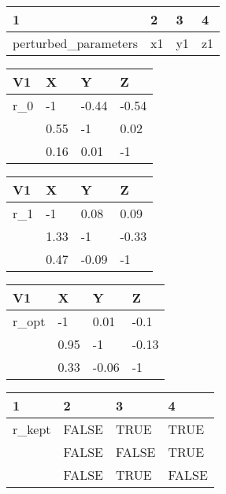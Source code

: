 \documentclass[10pt,a4paper]{article}
\begin{document}
\begin{table}[ht]
\centering
\begin{tabular}{llll}
  \hline
1 & 2 & 3 & 4 \\ 
  \hline
perturbed\_parameters & x1 & y1 & z1 \\ 
   \hline
\end{tabular}
\end{table}


\begin{table}[ht]
\centering
\begin{tabular}{llll}
  \hline
V1 & X & Y & Z \\ 
  \hline
r\_0 & -1 & -0.44 & -0.54 \\ 
   & 0.55 & -1 & 0.02 \\ 
   & 0.16 & 0.01 & -1 \\ 
   \hline
\end{tabular}
\end{table}


\begin{table}[ht]
\centering
\begin{tabular}{llll}
  \hline
V1 & X & Y & Z \\ 
  \hline
r\_1 & -1 & 0.08 & 0.09 \\ 
   & 1.33 & -1 & -0.33 \\ 
   & 0.47 & -0.09 & -1 \\ 
   \hline
\end{tabular}
\end{table}


\begin{table}[ht]
\centering
\begin{tabular}{llll}
  \hline
V1 & X & Y & Z \\ 
  \hline
r\_opt & -1 & 0.01 & -0.1 \\ 
   & 0.95 & -1 & -0.13 \\ 
   & 0.33 & -0.06 & -1 \\ 
   \hline
\end{tabular}
\end{table}


\begin{table}[ht]
\centering
\begin{tabular}{llll}
  \hline
1 & 2 & 3 & 4 \\ 
  \hline
r\_kept & FALSE & TRUE & TRUE \\ 
   & FALSE & FALSE & TRUE \\ 
   & FALSE & TRUE & FALSE \\ 
   \hline
\end{tabular}
\end{table}
 
\end{document}
